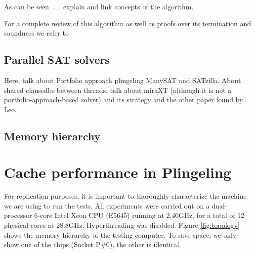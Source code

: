\documentclass{llncs}
\begin{document}
\IncMargin{1em}
\begin{algorithm}
  \BlankLine
  \Cost {}\;
  \J {}\;
  $F_w$ \assign $F$\;
  \Dec \assign DECIDE()\;
    \Return SAT\;
    DECIDE( \Dec )\;
  }

  \caption{CDCL algorithm}
\label{alg:CDCL}
\end{algorithm}
\DecMargin{1em}

As can be seen ..... explain and link concepts of the algorithm.

For a complete review of this algorithm as well as proofs over its
termination and soundness we refer to \cite{Nieuwenhuisetal2006JACM}


\subsection{Parallel SAT solvers}

Here, talk about Portfolio approach plingeling ManySAT and
SATzilla. About shared clausedbs between threads, talk about miraXT
(although it is not a portfolio-approach-based solver) and its
strategy and the other paper found by Leo.


\subsection{Memory hierarchy}
\label{sec:memhier}


\section{Cache performance in Plingeling}

For replication purposes, it is important to thoroughly characterize
the machine we are using to run the tests. All experiments were
carried out on a dual-processor 6-core Intel Xeon CPU (E5645) running
at 2.40GHz, for a total of 12 physical cores at
28.8GHz. Hyperthreading was disabled. Figure \ref{fig:topology} shows
the memory hierarchy of the testing computer. To save space, we only
show one of the chips (Socket P\#0), the other is identical.
\end{document}

